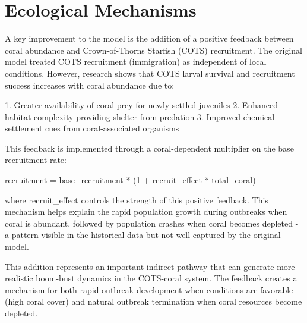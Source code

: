 \section{Ecological Mechanisms}

A key improvement to the model is the addition of a positive feedback between coral abundance and Crown-of-Thorns Starfish (COTS) recruitment. The original model treated COTS recruitment (immigration) as independent of local conditions. However, research shows that COTS larval survival and recruitment success increases with coral abundance due to:

1. Greater availability of coral prey for newly settled juveniles
2. Enhanced habitat complexity providing shelter from predation
3. Improved chemical settlement cues from coral-associated organisms

This feedback is implemented through a coral-dependent multiplier on the base recruitment rate:

recruitment = base\_recruitment * (1 + recruit\_effect * total\_coral)

where recruit\_effect controls the strength of this positive feedback. This mechanism helps explain the rapid population growth during outbreaks when coral is abundant, followed by population crashes when coral becomes depleted - a pattern visible in the historical data but not well-captured by the original model.

This addition represents an important indirect pathway that can generate more realistic boom-bust dynamics in the COTS-coral system. The feedback creates a mechanism for both rapid outbreak development when conditions are favorable (high coral cover) and natural outbreak termination when coral resources become depleted.
